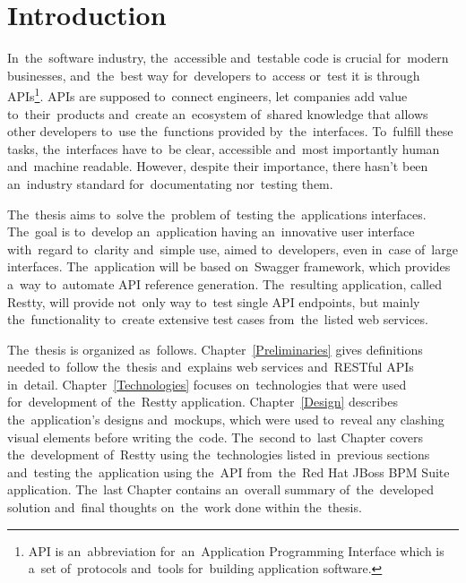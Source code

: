 



\chapter{Introduction}
In~the~software industry, the~accessible and~testable code is crucial for~modern
businesses, and~the~best way for~developers to~access or~test it is through
APIs\footnote{API is an~abbreviation for~an~Application Programming Interface
which is a~set of~protocols and~tools for~building application software.}. APIs
are supposed to~connect engineers, let companies add value to~their~products
and~create an~ecosystem of~shared knowledge that allows other developers to~use
the~functions provided by~the~interfaces. To~fulfill these tasks, the~interfaces
have to~be clear, accessible and~most importantly human and~machine readable. 
However, despite their importance, there hasn't been an~industry standard
for~documentating nor~testing them.

The~thesis aims to~solve the~problem of~testing the~applications interfaces.
The~goal is to~develop an~application having an~innovative user interface
with~regard to~clarity and~simple use, aimed to~developers, even in~case
of~large interfaces. The~application will be based on~Swagger framework, which
provides a~way to~automate API reference generation. The~resulting application,
called Restty, will provide not~only way to~test single API endpoints, but
mainly the~functionality to~create extensive test cases from~the~listed web
services.

The~thesis is organized as~follows. Chapter~\ref{Preliminaries} gives
definitions needed to~follow the~thesis and~explains web services and~RESTful
APIs in~detail. Chapter~\ref{Technologies} focuses on~technologies that were
used for~development of~the~Restty application. Chapter~\ref{Design} describes
the~application's designs and~mockups, which were used to~reveal any clashing
visual elements before writing the~code. The~second to~last
Chapter covers the~development of~Restty using the~technologies listed
in~previous sections and~testing the~application using the~API from~the~Red Hat
JBoss BPM Suite application. The~last Chapter contains an~overall summary
of~the~developed solution and~final thoughts on~the~work done within the~thesis.






